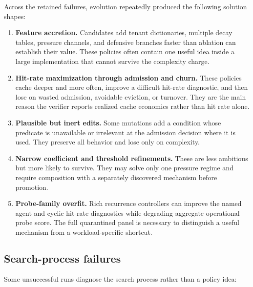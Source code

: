 \documentclass[11pt]{article}
\begin{document}
Across the retained failures, evolution repeatedly produced the following solution
shapes:

\begin{enumerate}
  \item \textbf{Feature accretion.}  Candidates add tenant dictionaries, multiple
  decay tables, pressure channels, and defensive branches faster than ablation can
  establish their value.  These policies often contain one useful idea inside a large
  implementation that cannot survive the complexity charge.
  \item \textbf{Hit-rate maximization through admission and churn.}  These policies
  cache deeper and more often, improve a difficult hit-rate diagnostic, and then lose
  on wasted admission, avoidable eviction, or turnover.  They are the main reason the
  verifier reports realized cache economics rather than hit rate alone.
  \item \textbf{Plausible but inert edits.}  Some mutations add a condition whose
  predicate is unavailable or irrelevant at the admission decision where it is used.
  They preserve all behavior and lose only on complexity.
  \item \textbf{Narrow coefficient and threshold refinements.}  These are less
  ambitious but more likely to survive.  They may solve only one pressure regime and
  require composition with a separately discovered mechanism before promotion.
  \item \textbf{Probe-family overfit.}  Rich recurrence controllers can improve the
  named agent and cyclic hit-rate diagnostics while degrading aggregate operational
  probe score.  The full quarantined panel is necessary to distinguish a useful
  mechanism from a workload-specific shortcut.
\end{enumerate}

\subsection{Search-process failures}

Some unsuccessful runs diagnose the search process rather than a policy idea:
\end{document}

